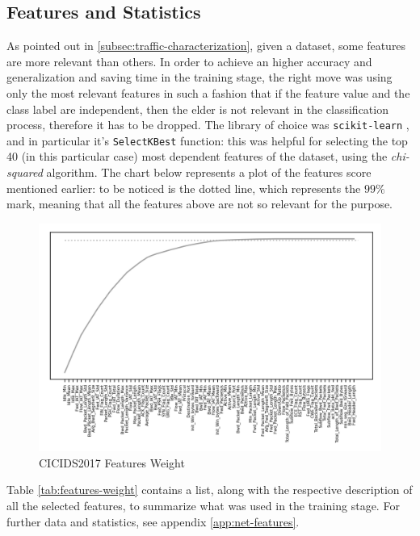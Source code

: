 
\subsection{Features and Statistics}
\label{subsec:features-statistics}

As pointed out in \ref{subsec:traffic-characterization}, given a dataset, some features are more relevant than others. In order to achieve an higher accuracy and generalization and saving time in the training stage, the right move was using only the most relevant features in such a fashion that if the feature value and the class label are independent, then the elder is not relevant in the classification process, therefore it has to be dropped. The library of choice was \texttt{scikit-learn} \cite{ScikitWebsite}, and in particular it's \texttt{SelectKBest} function: this was helpful for selecting the top 40 (in this particular case) most dependent features of the dataset, using the \textit{chi-squared} algorithm. The chart below represents a plot of the features score mentioned earlier: to be noticed is the dotted line, which represents the $99\%$ mark, meaning that all the features above are not so relevant for the purpose.

\begin{figure}[h!]
    \centering
    \includegraphics[scale=1]{assets/figures/chapter3/features99.png}
    \caption{CICIDS2017 Features Weight}
    \label{fig:features-weight}
\end{figure}

\noindent Table \ref{tab:features-weight} contains a list, along with the respective description of all the selected features, to summarize what was used in the training stage. For further data and statistics, see appendix \ref{app:net-features}.


